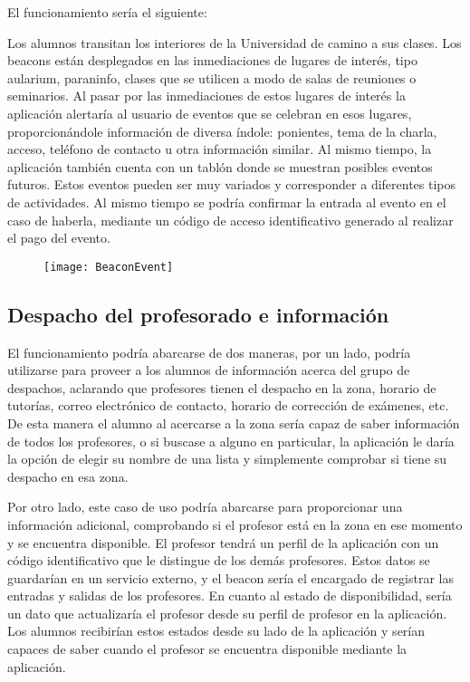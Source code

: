 El funcionamiento sería el siguiente: 

Los alumnos transitan los interiores de la Universidad de camino a sus clases. Los beacons están desplegados en las inmediaciones de lugares de interés, tipo aularium, paraninfo, clases que se utilicen a modo de salas de reuniones o seminarios. Al pasar por las inmediaciones de estos lugares de interés la aplicación alertaría al usuario de eventos que se celebran en esos lugares, proporcionándole información de diversa índole: ponientes, tema de la charla, acceso, teléfono de contacto u otra información similar.  Al mismo tiempo, la aplicación también cuenta con un tablón donde se muestran posibles eventos futuros. Estos eventos pueden ser muy variados y corresponder a diferentes tipos de actividades. Al mismo tiempo se podría confirmar la entrada al evento en el caso de haberla, mediante un código de acceso identificativo generado al realizar el pago del evento.

\begin{figure}[H]
	\centering
	\texttt{[image: BeaconEvent]}
	\label{fig:eventBeacon}
\end{figure}

\subsection{Despacho del profesorado e información}

El funcionamiento podría abarcarse de dos maneras, por un lado, podría utilizarse para proveer a los alumnos de información acerca del grupo de despachos, aclarando que profesores tienen el despacho en la zona, horario de tutorías, correo electrónico de contacto, horario de corrección de exámenes, etc. De esta manera el alumno al acercarse a la zona sería capaz de saber información de todos los profesores, o si buscase a alguno en particular, la aplicación le daría la opción de elegir su nombre de una lista y simplemente comprobar si tiene su despacho en esa zona. 

Por otro lado, este caso de uso podría abarcarse para proporcionar una información adicional, comprobando si el profesor está en la zona en ese momento y se encuentra disponible. El profesor tendrá un perfil de la aplicación con un código identificativo que le distingue de los demás profesores. Estos datos se guardarían en un servicio externo, y el beacon sería el encargado de registrar las entradas y salidas de los profesores. En cuanto al estado de disponibilidad, sería un dato que actualizaría el profesor desde su perfil de profesor en la aplicación. Los alumnos recibirían estos estados desde su lado de la aplicación y serían capaces de saber cuando el profesor se encuentra disponible mediante la aplicación. 

